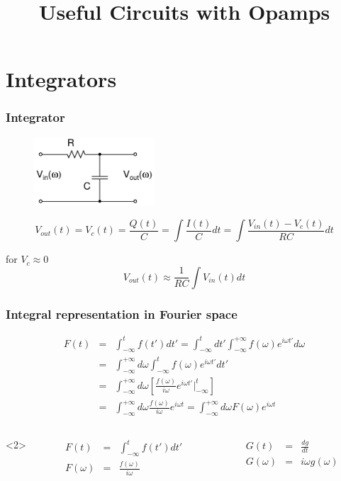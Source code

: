 \documentclass[beamer]{standalone}
\begin{document}
\title[Electronics 1]{Useful Circuits with Opamps}

\begin{frame} 
  \titlepage
\end{frame}

\section{Integrators}
\begin{frame}
\frametitle{Integrator}
\begin{figure}
	\includegraphics[width=0.40\textwidth]{./schematics/rc_low_pass.pdf}
\end{figure}
\[
V_{out}(t)=V_c(t)= \frac{Q(t)}{C} = \int \frac{I(t)}{C} dt 
= \int \frac{V_{in}(t)-V_c(t)}{RC} dt 
\]
\begin{block}{for $V_c \approx 0$}
\[
V_{out}(t) \approx \frac{1}{RC}\int V_{in}(t) dt
\]
\end{block}
\end{frame}

\begin{frame}[t]
\frametitle{Integral representation in Fourier space}
\begin{eqnarray*}
F(t) 
&=& \int^t_{-\infty} f(t') dt' 
=  \int^t_{-\infty} dt' \int^{+\infty}_{-\infty} f(\omega) e^{  i \omega t'} d\omega \\
&=&  \int^{+\infty}_{-\infty} d\omega \int^{t}_{-\infty} f(\omega) e^{  i
\omega t'} dt' \\
&=&  \int^{+\infty}_{-\infty} d\omega \left[ \frac{ f(\omega) }{ i \omega} e^{
i \omega t'}  {\Big|}^t_{-\infty} \right] \\
&=&  \int^{+\infty}_{-\infty} d\omega  \frac{ f(\omega) }{ i \omega} e^{
i \omega t} 
=  \int^{+\infty}_{-\infty} d\omega   F(\omega)  e^{ i \omega t} 
\end{eqnarray*}
\begin{columns}<2>
\begin{column}{0.5\textwidth}
\begin{eqnarray*}
F(t) &=& \int^t_{-\infty} f(t') dt' \\
F(\omega) &=&  \frac{ f(\omega) }{ i \omega}
\end{eqnarray*}
\end{column}
\begin{column}{0.5\textwidth}
\begin{eqnarray*}
G(t) &=& \frac{d g}{d t} \\
G(\omega) &=&   i \omega g(\omega)
\end{eqnarray*}
\end{column}
\end{columns}
\end{frame}
\end{document}
